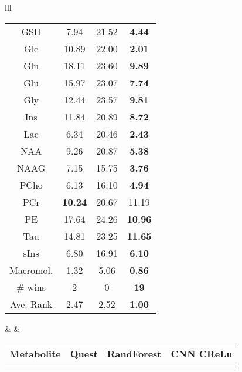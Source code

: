 \documentclass{llncs}
\begin{document}
\begin{table*}
\begin{center}
\begin{tabular}{lll}
\begin{tabular}{c c c c}
GSH      &       7.94      & 21.52 	& \bf 4.44 	\\
Glc      &       10.89     & 22.00 	& \bf 2.01 	\\
Gln      &       18.11     & 23.60 	& \bf 9.89 	\\
Glu      &       15.97     & 23.07 	& \bf 7.74 	\\
Gly      &       12.44     & 23.57 	& \bf 9.81 	\\
Ins      &       11.84     & 20.89 	& \bf 8.72 	\\
Lac      &       6.34      & 20.46 	& \bf 2.43 	\\
NAA      &       9.26      & 20.87 	& \bf 5.38 	\\
NAAG     &       7.15      & 15.75 	& \bf 3.76 	\\
PCho     &       6.13      & 16.10 	& \bf 4.94 	\\
PCr      &  \bf  10.24     & 20.67 	&     11.19 	\\
PE       &       17.64     & 24.26 	& \bf 10.96 	\\
Tau      &       14.81     & 23.25 	& \bf 11.65 	\\
sIns     &       6.80      & 16.91 	& \bf 6.10 	\\
\hdashline   
Macromol.&       1.32      & 5.06 	& \bf 0.86 	\\
[2pt]
\hline
\# wins   & 2              & 0          & \bf 19 \\
Ave. Rank & 2.47           & 2.52       &  \bf 1.00 \\ %
\hline
\end{tabular}
&
\hspace{1mm}
&
\begin{tabular}{c c c c}
\hline
Metabolite & Quest & RandForest  & CNN CReLu\\[2pt]
\hline\rule{0pt}{12pt}

\end{tabular}
\end{tabular}
\end{center}
\end{table*}
\end{document}
